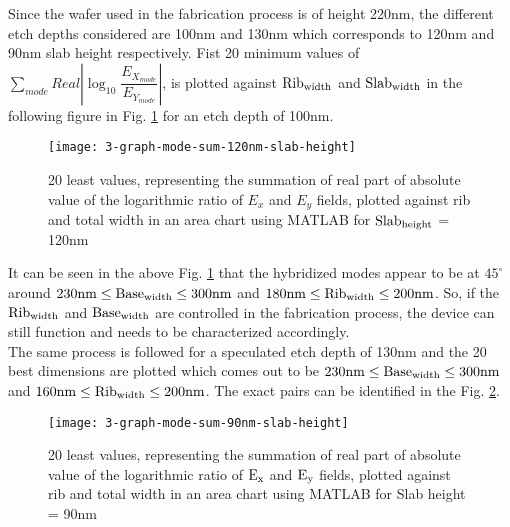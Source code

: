 \documentclass[../report.tex]{subfiles}
\begin{document}
Since the wafer used in the fabrication process is of height 220nm, the different etch depths considered are 100nm and 130nm which corresponds to 120nm and 90nm slab height respectively. Fist 20 minimum values of $\sum _{mode}Real\left| \log _{10}\dfrac {E_{X_{mode}}} {E_{Y_{mode}}}\right|$, is plotted against $\mathrm{Rib_{width}}$ and $\mathrm{Slab_{width}}$ in the following figure in Fig. \ref{fig:3_graph_mode_sum_120nm_slab_height} for an etch depth of 100nm. 

\begin{figure}[H] %
	\centering
	\texttt{[image: 3-graph-mode-sum-120nm-slab-height]}
	\caption{20 least values, representing the summation of real part of absolute value of the logarithmic ratio of $E_x$ and $E_y$ fields, plotted against rib and total width in an area chart using MATLAB for $\mathrm{Slab_{height}}$ = 120nm}
	\label{fig:3_graph_mode_sum_120nm_slab_height}
\end{figure}
\noindent It can be seen in the above Fig. \ref{fig:3_graph_mode_sum_120nm_slab_height} that the hybridized modes appear to be at $45^{\circ}$ around $\mathrm{230nm \leq Base_{width} \leq 300nm}$ and $\mathrm{180nm \leq Rib_{width} \leq 200nm}$. So, if the $\mathrm{Rib_{width}}$ and $\mathrm{Base_{width}}$ are controlled in the fabrication process, the device can still function and needs to be characterized accordingly.\\

The same process is followed for a speculated etch depth of 130nm and the 20 best dimensions are plotted which comes out to be $\mathrm{230nm \leq Base_{width} \leq 300nm}$ and $\mathrm{160nm \leq Rib_{width} \leq 200nm}$. The exact pairs can be identified in the Fig. \ref{fig:3_graph_mode_sum_90nm_slab_height}.
\begin{figure}[H] %
	\centering
	\texttt{[image: 3-graph-mode-sum-90nm-slab-height]}
	\caption{20 least values, representing the summation of real part of absolute value of the logarithmic ratio of $\mathrm{E_x}$ and $\mathrm{E_y}$ fields, plotted against rib and total width in an area chart using MATLAB for Slab height = 90nm}
	\label{fig:3_graph_mode_sum_90nm_slab_height}
\end{figure}
\end{document}
